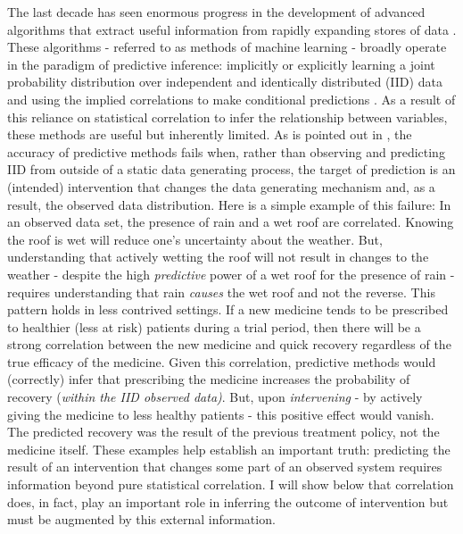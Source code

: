 \documentclass[../main.tex]{subfiles}
\begin{document}
The last decade has seen enormous progress in the development of advanced algorithms that extract useful information from rapidly expanding stores of data \parencite{Lecun2015DeepLearning}. These algorithms - referred to as methods of machine learning - broadly operate in the paradigm of predictive inference: implicitly or explicitly learning a joint probability distribution over independent and identically distributed (IID) data and using the implied correlations to make conditional predictions \parencite{Scholkopf2019CausalityLearning}. As a result of this reliance on statistical correlation to infer the relationship between variables, these methods are useful but inherently limited. As is pointed out in \textcite{Pearl2009CausalOverview}, the accuracy of predictive methods fails when, rather than observing and predicting IID from outside of a static data generating process, the target of prediction is an (intended) intervention that changes the data generating mechanism and, as a result, the observed data distribution. Here is a simple example of this failure: In an observed data set, the presence of rain and a wet roof are correlated. Knowing the roof is wet will reduce one’s uncertainty about the weather. But, understanding that actively wetting the roof will not result in changes to the weather - despite the high \textit{predictive} power of a wet roof for the presence of rain - requires understanding that rain \textit{causes} the wet roof and not the reverse. This pattern holds in less contrived settings. If a new medicine tends to be prescribed to healthier (less at risk) patients during a trial period, then there will be a strong correlation between the new medicine and quick recovery regardless of the true efficacy of the medicine. Given this correlation, predictive methods would (correctly) infer that prescribing the medicine increases the probability of recovery (\textit{within the IID observed data)}. But, upon \textit{intervening} - by actively giving the medicine to less healthy patients - this positive effect would vanish. The predicted recovery was the result of the previous treatment policy, not the medicine itself. These examples help establish an important truth: predicting the result of an intervention that changes some part of an observed system requires information beyond pure statistical correlation. I will show below that correlation does, in fact, play an important role in inferring the outcome of intervention but must be augmented by this external information.\par
\end{document}
